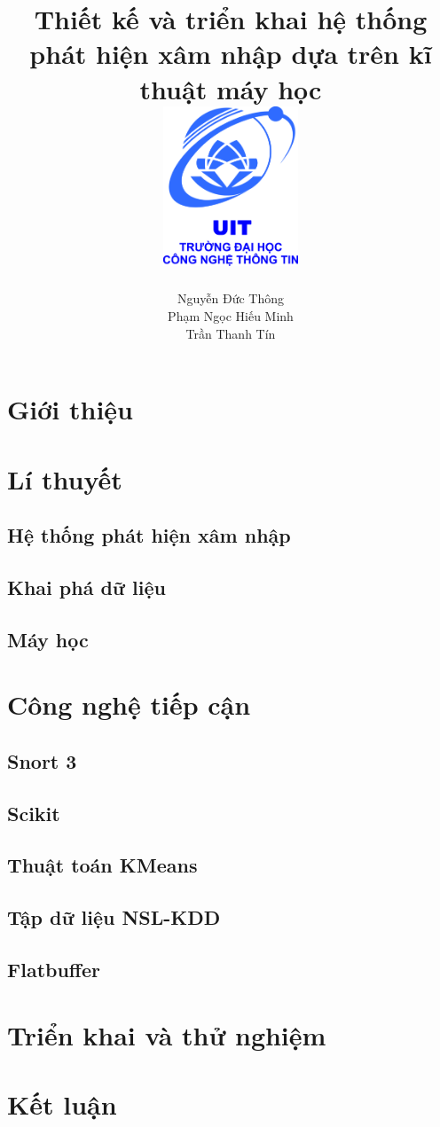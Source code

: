 \documentclass[12pt,twoside]{report}
\title{
    {Thiết kế và triển khai hệ thống phát hiện xâm nhập dựa trên kĩ thuật máy học}\\
    {\includegraphics[width=4cm]{logo}}
}
\author{
    Nguyễn Đức Thông
    \\
    Phạm Ngọc Hiếu Minh
    \\
    Trần Thanh Tín
}
\begin{document}
\maketitle
\newpage
\tableofcontents
\listoffigures
\listoftables
\newpage

    \chapter{Giới thiệu}
    
    \newpage
    \chapter{Lí thuyết}
    \section{Hệ thống phát hiện xâm nhập}
    
    \section{Khai phá dữ liệu}
    
    \section{Máy học}
    
    \newpage
    \chapter{Công nghệ tiếp cận}
    \section{Snort 3}
    
    \section{Scikit}
    
    \section{Thuật toán KMeans}
    
    \section{Tập dữ liệu NSL-KDD}
    
    \section{Flatbuffer}
    
    \newpage
    \chapter{Triển khai và thử nghiệm}
    
    \newpage
    \chapter{Kết luận}
    

\newpage


\end{document}
